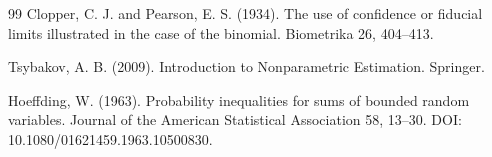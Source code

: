 \documentclass{article}
\begin{document}
\begin{thebibliography}{99}
   Clopper, C. J. and Pearson, E. S. (1934). The use of confidence or fiducial limits illustrated in the case of the binomial. Biometrika 26, 404--413.

   Tsybakov, A. B. (2009). Introduction to Nonparametric Estimation. Springer.

   Hoeffding, W. (1963). Probability inequalities for sums of bounded random variables. Journal of the American Statistical Association 58, 13--30. DOI: 10.1080/01621459.1963.10500830.

\end{thebibliography}
\end{document}
